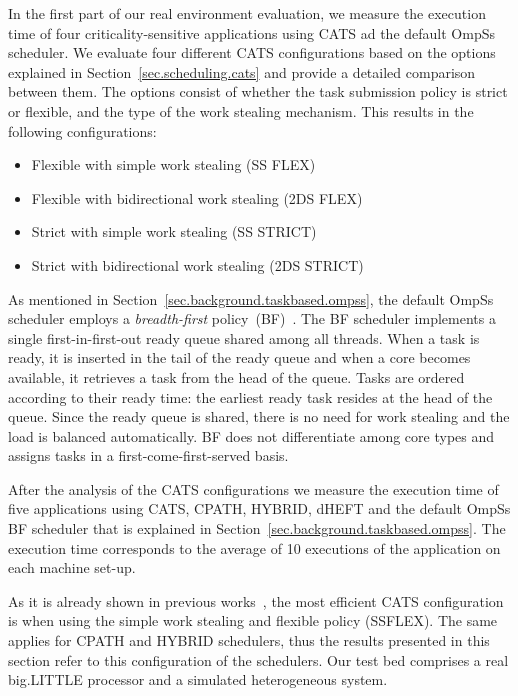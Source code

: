 In the first part of our real environment evaluation, we measure the execution time of four criticality-sensitive applications using CATS ad the default OmpSs scheduler. 
We evaluate four different CATS configurations based on the options explained in Section~\ref{sec.scheduling.cats} and provide a detailed comparison between them. 
The options consist of whether the task submission policy is strict or flexible, and the type of the work stealing mechanism. 
This results in the following configurations:
\begin{itemize}
	\itemsep0em
	\item Flexible with simple work stealing (SS FLEX)
	\item Flexible with bidirectional work stealing (2DS FLEX)
	\item Strict with simple work stealing (SS STRICT)
	\item Strict with bidirectional work stealing (2DS STRICT)
\end{itemize}

As mentioned in Section~\ref{sec.background.taskbased.ompss}, the default OmpSs scheduler employs a \textit{breadth-first} policy~(BF)~\cite{Duran_schedulers_08}. 
The BF scheduler implements a single first-in-first-out ready queue shared among all threads. 
When a task is ready, it is inserted in the tail of the ready queue and when a core becomes available, it retrieves a task from the head of the queue. Tasks are ordered according to their ready time: the earliest ready task resides at the head of the queue. Since the ready queue is shared, there is no need for work stealing and the load is balanced automatically. BF does not differentiate among core types and assigns tasks in a first-come-first-served basis.

After the analysis of the CATS configurations we measure the execution time of five applications using CATS, CPATH, HYBRID, dHEFT and the default OmpSs BF scheduler that is explained in Section~\ref{sec.background.taskbased.ompss}. 
The execution time corresponds to the average of 10 executions of the application on each machine set-up.

As it is already shown in previous works~\cite{Chronaki:ICS2015}, the most efficient CATS configuration is when using the simple work stealing and flexible policy (SSFLEX).
The same applies for CPATH and HYBRID schedulers, thus the results presented in this section refer to this configuration of the schedulers. 
\fi %
Our test bed comprises a real big.LITTLE processor and a simulated heterogeneous system.

